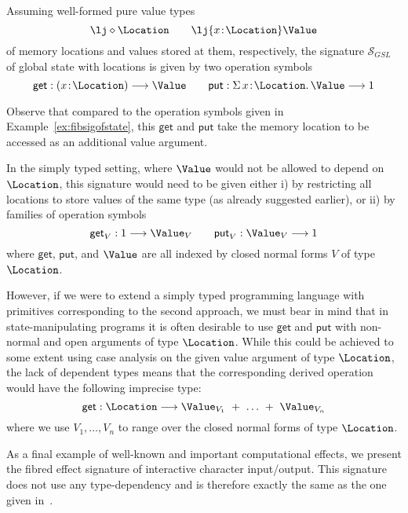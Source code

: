 \begin{example}
\label{ex:fibsigofstatewithlocations}
Assuming well-formed pure value types 
\[
\lj \diamond \Location
\qquad
\lj {x \!:\! \Location} \Value
\]
of memory locations and values stored at them, respectively, the signature $\mathcal{S}_{GSL}$ of global state with locations is  given by two operation symbols
\[
\mathsf{get} : (x \!:\! \Location) \longrightarrow \Value
\qquad
\mathsf{put} : \Sigma\, x \!:\! \Location .\, \Value \longrightarrow 1
\]

Observe that compared to the operation symbols given in Example~\ref{ex:fibsigofstate}, this $\mathsf{get}$ and $\mathsf{put}$ take the memory location to be accessed as an additional value argument.
\end{example}

In the simply typed setting, where $\Value$ would not be allowed to depend on $\Location$, this signature would need to be given either i) by restricting all locations to store values of the same type (as already suggested earlier), or ii) by families of operation symbols
\[
\mathsf{get}_V : 1 \longrightarrow \Value_V
\qquad
\mathsf{put}_V : \Value_V \longrightarrow 1
\]
where $\mathsf{get}$, $\mathsf{put}$, and $\Value$ are all indexed by closed normal forms $V$ of type $\Location$. 

However, if we were to extend a simply typed programming language with primitives corresponding to the second approach, we must bear in mind that in state-manipulating programs it is often desirable to use $\mathsf{get}$ and $\mathsf{put}$ with non-normal and open arguments of type $\Location$. While this could be achieved to some extent using case analysis on the given value argument of type $\Location$, the lack of dependent types means that the corresponding derived operation would have the following imprecise type:
\[
\mathsf{get} : \Location \longrightarrow \Value_{V_1} ~+~ \ldots ~+~ \Value_{V_n}
\]
where we use $V_1, \ldots, V_n$ to range over the closed normal forms of type $\Location$.


As a final example of well-known and important computational effects, we present the fibred effect signature of interactive character input/output. This signature does not use any type-dependency and is therefore exactly the same as the one given in~\cite{Plotkin:HandlingEffects}.


